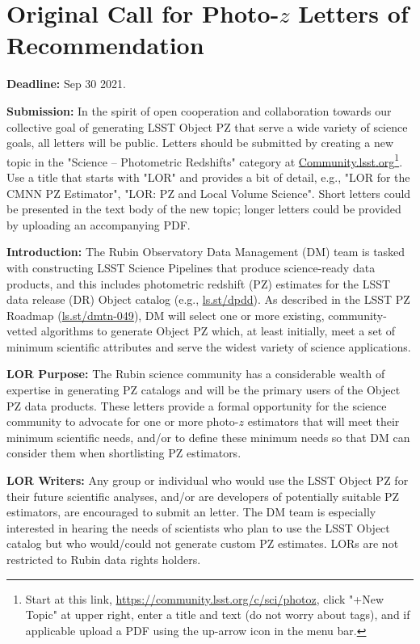 \documentclass[DM,authoryear,toc]{lsstdoc}
\begin{document}
\section{Original Call for Photo-$z$ Letters of Recommendation}\label{sec:orig_LOR}

\textbf{Deadline:} Sep 30 2021.

\textbf{Submission:} 
In the spirit of open cooperation and collaboration towards our collective goal of generating LSST Object PZ that serve a wide variety of science goals, all letters will be public.
Letters should be submitted by creating a new topic in the "Science -- Photometric Redshifts" category at \url{Community.lsst.org}\footnote{Start at this link, \url{https://community.lsst.org/c/sci/photoz}, click "+New Topic" at upper right, enter a title and text (do not worry about tags), and if applicable upload a PDF using the up-arrow icon in the menu bar.}.
Use a title that starts with "LOR" and provides a bit of detail, e.g., "LOR for the CMNN PZ Estimator", "LOR: PZ and Local Volume Science".
Short letters could be presented in the text body of the new topic; longer letters could be provided by uploading an accompanying PDF.

\textbf{Introduction:} 
The Rubin Observatory Data Management (DM) team is tasked with constructing LSST Science Pipelines that produce science-ready data products, and this includes photometric redshift (PZ) estimates for the LSST data release (DR) Object catalog (e.g., \url{ls.st/dpdd}).
As described in the LSST PZ Roadmap (\url{ls.st/dmtn-049}), DM will select one or more existing, community-vetted algorithms to generate Object PZ which, at least initially, meet a set of minimum scientific attributes and serve the widest variety of science applications.

\textbf{LOR Purpose:}
The Rubin science community has a considerable wealth of expertise in generating PZ catalogs and will be the primary users of the Object PZ data products.
These letters provide a formal opportunity for the science community to advocate for one or more photo-$z$ estimators that will meet their minimum scientific needs, and/or to define these minimum needs so that DM can consider them when shortlisting PZ estimators.

\textbf{LOR Writers:}
Any group or individual who would use the LSST Object PZ for their future scientific analyses, and/or are developers of potentially suitable PZ estimators, are encouraged to submit an letter.
The DM team is especially interested in hearing the needs of scientists who plan to use the LSST Object catalog but who would/could not generate custom PZ estimates.
LORs are not restricted to Rubin data rights holders.
\end{document}
